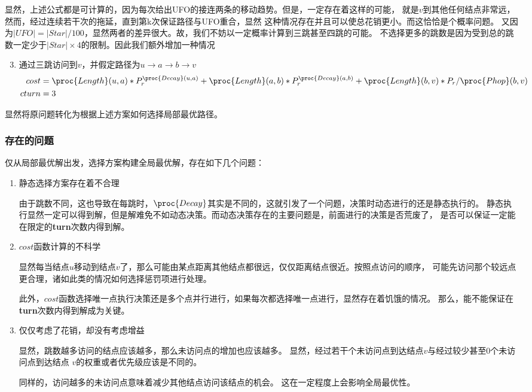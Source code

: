 \documentclass[hyperref,UTF8]{ctexart}
\theoremstyle{definition}
\theoremstyle{remark}
\numberwithin{equation}{subsection}
\newcommand{\Emph}{\textbf}
\begin{document}
	显然，上述公式都是可计算的，因为每次给出UFO的接连两条的移动趋势。但是，一定存在着这样的可能，
	就是$v$到其他任何结点非常远，然而，经过连续若干次的拖延，直到第k次保证路径与UFO重合，显然
	这种情况存在并且可以使总花销更小。而这恰恰是个概率问题。
	又因为$|UFO| = |Star|/100$，显然两者的差异很大。故，我们不妨以一定概率计算到三跳甚至四跳的可能。
	不选择更多的跳数是因为受到总的跳数一定少于$|Star| \times 4$的限制。因此我们额外增加一种情况
	\begin{enumerate}[(1)]
	\setcounter{enumi}{2}
		
		\item 通过三跳访问到$v$，并假定路径为$u \rightarrow a \rightarrow b \rightarrow v$
		\begin{align*}
			cost	&= \proc{Length}(u, a) * P_r^{\proc{Decay}(u, a)} + \proc{Length}(a, b) * P_r^{\proc{Decay}(a, b)} + \proc{Length}(b, v) * P_r / \proc{Phop}(b, v)	\\
			cturn	&= 3
		\end{align*}
		
	\end{enumerate}
	
	显然将原问题转化为根据上述方案如何选择局部最优路径。
	
\subsubsection{存在的问题}

	仅从局部最优解出发，选择方案构建全局最优解，存在如下几个问题：
	\begin{enumerate}[(1)]
		
		\item 静态选择方案存在着不合理
		
		由于跳数不同，这也导致在每跳时，$\proc{Decay}$其实是不同的，这就引发了一个问题，决策时动态进行的还是静态执行的。
		静态执行显然一定可以得到解，但是解难免不如动态决策。而动态决策存在的主要问题是，前面进行的决策是否荒废了，
		是否可以保证一定能在限定的\Emph{turn}次数内得到解。
		
		\item $cost$函数计算的不科学
		
		显然每当结点$u$移动到结点$v$了，那么可能由某点距离其他结点都很远，仅仅距离结点很近。按照点访问的顺序，
		可能先访问那个较远点更合理，诸如此类的情况如何选择惩罚项进行处理。
		
		此外，$cost$函数选择唯一点执行决策还是多个点并行进行，如果每次都选择唯一点进行，显然存在着饥饿的情况。
		那么，能不能保证在\Emph{turn}次数内得到解成为关键。
		
		\item  仅仅考虑了花销，却没有考虑增益
		
		显然，跳数越多访问的结点应该越多，那么未访问点的增加也应该越多。
		显然，经过若干个未访问点到达结点$v$与经过较少甚至0个未访问点到达结点
		$v$的权重或者优先级应该是不同的。
		
		同样的，访问越多的未访问点意味着减少其他结点访问该结点的机会。
		这在一定程度上会影响全局最优性。
		
	\end{enumerate}
	
\end{document}
